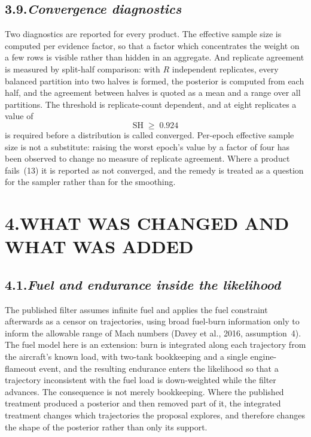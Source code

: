 \documentclass[12pt,a4paper]{article}
\begin{document}
\subsection*{3.9.\quad \textit{Convergence diagnostics}}

Two diagnostics are reported for every product. The effective sample size is computed per
evidence factor, so that a factor which concentrates the weight on a few rows is visible rather
than hidden in an aggregate. And replicate agreement is measured by split-half comparison: with
$R$ independent replicates, every balanced partition into two halves is formed, the posterior is
computed from each half, and the agreement between halves is quoted as a mean and a range over
all partitions. The threshold is replicate-count dependent, and at eight replicates a value of
%
\begin{equation}
\mathrm{SH} \;\geq\; 0.924
\end{equation}
%
is required before a distribution is called converged. Per-epoch effective sample size is not a
substitute: raising the worst epoch's value by a factor of four has been observed to change no
measure of replicate agreement. Where a product fails~(13) it is reported as not converged, and
the remedy is treated as a question for the sampler rather than for the smoothing.

\section*{4.\quad WHAT WAS CHANGED AND WHAT WAS ADDED}

\subsection*{4.1.\quad \textit{Fuel and endurance inside the likelihood}}

The published filter assumes infinite fuel and applies the fuel constraint afterwards as a
censor on trajectories, using broad fuel-burn information only to inform the allowable range of
Mach numbers (Davey et al., 2016, assumption~4). The fuel model here is an extension: burn is
integrated along each trajectory from the aircraft's known load, with two-tank bookkeeping and a
single engine-flameout event, and the resulting endurance enters the likelihood so that a
trajectory inconsistent with the fuel load is down-weighted while the filter advances. The
consequence is not merely bookkeeping. Where the published treatment produced a posterior and
then removed part of it, the integrated treatment changes which trajectories the proposal
explores, and therefore changes the shape of the posterior rather than only its support.
\end{document}
